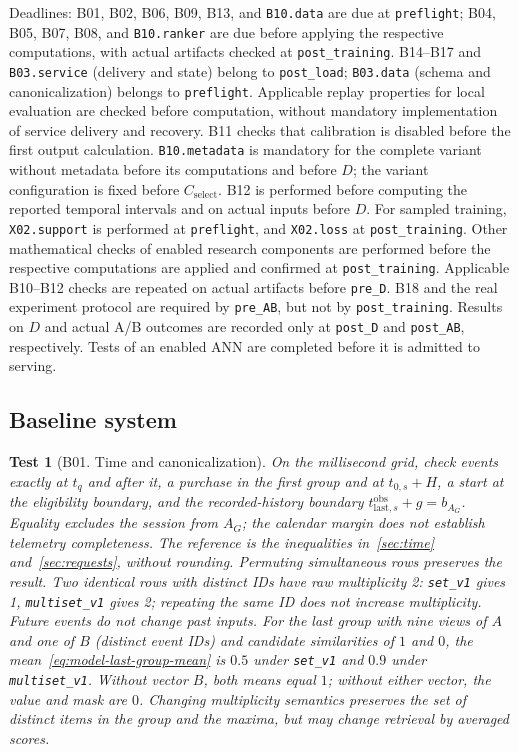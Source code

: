 \documentclass[12pt,a4paper]{article}
\newcommand{\code}[1]{{\ttfamily\small\nolinkurl{#1}}}
\theoremstyle{plainru}
\newtheorem{testcase}{Test}[section]
\begin{document}
Deadlines: B01, B02, B06, B09, B13, and \code{B10.data} are due at \code{preflight};
B04, B05, B07, B08, and \code{B10.ranker} are due before applying the respective
computations, with actual artifacts checked at \code{post_training}.
B14--B17 and \code{B03.service} (delivery and state) belong
to \code{post_load}; \code{B03.data} (schema and canonicalization) belongs to \code{preflight}.
Applicable replay properties for local evaluation are checked
before computation, without mandatory implementation of service delivery and recovery.
B11 checks that calibration is disabled before the first output calculation.
\code{B10.metadata} is mandatory for the complete variant
without metadata before its computations and before $D$; the variant configuration
is fixed before $C_{\mathrm{select}}$.
B12 is performed before computing the reported temporal intervals
and on actual inputs before $D$.
For sampled training, \code{X02.support} is performed at
\code{preflight}, and \code{X02.loss} at \code{post_training}.
Other mathematical checks of enabled research components
are performed before the respective computations are applied and confirmed
at \code{post_training}. Applicable B10--B12 checks are repeated on actual
artifacts before \code{pre_D}. B18 and the real experiment protocol
are required by \code{pre_AB}, but not by \code{post_training}.
Results on $D$ and actual A/B outcomes
are recorded only at \code{post_D} and \code{post_AB}, respectively.
Tests of an enabled ANN are completed before it is admitted to serving.

\subsection{Baseline system}\label{app:tests-base}

\begin{testcase}[B01. Time and canonicalization]
On the millisecond grid, check events exactly at $t_q$ and after it,
a purchase in the first group and at $t_{0,s}+H$, a start at the eligibility boundary,
and the recorded-history boundary $t_{\mathrm{last},s}^{\mathrm{obs}}+g=b_{A_G}$.
Equality excludes the session from $A_G$; the calendar margin does not establish
telemetry completeness.
The reference is the inequalities in~\ref{sec:time} and~\ref{sec:requests}, without rounding.
Permuting simultaneous rows preserves the result.
Two identical rows with distinct IDs have raw multiplicity 2:
\code{set_v1} gives 1, \code{multiset_v1} gives 2; repeating the same ID
does not increase multiplicity. Future events do not change past inputs.
For the last group with nine views of $A$ and one of $B$
(distinct event IDs) and candidate similarities of $1$ and $0$,
the mean~\eqref{eq:model-last-group-mean} is $0.5$ under \code{set_v1}
and $0.9$ under \code{multiset_v1}. Without vector $B$, both means equal $1$;
without either vector, the value and mask are $0$.
Changing multiplicity semantics preserves the set of distinct items
in the group and the maxima, but may change retrieval by averaged scores.
\end{testcase}
\end{document}
